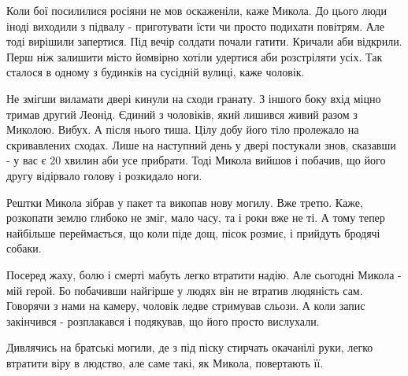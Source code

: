 
Коли бої посилилися росіяни не мов оскаженіли, каже Микола. До цього люди іноді
виходили з підвалу - приготувати їсти чи просто подихати повітрям. Але тоді
вирішили запертися. Під вечір солдати почали гатити. Кричали аби відкрили. Перш
ніж залишити місто йомвірно хотіли удертися аби розстріляти усіх. Так сталося в
одному з будинків на сусідній вулиці, каже чоловік.

Не змігши виламати двері кинули на сходи гранату. З іншого боку вхід міцно
тримав другий Леонід. Єдиний з чоловіків, який лишився живий разом з Миколою.
Вибух. А після нього тиша. Цілу добу його тіло пролежало на скривавлених
сходах. Лише на наступний день у двері постукали знов, сказавши - у вас є 20
хвилин аби усе прибрати. Тоді Микола вийшов і побачив, що його другу відірвало
голову і розкидало ноги.

Рештки Микола зібрав у пакет та викопав нову могилу. Вже третю. Каже, розкопати
землю глибоко не зміг, мало часу, та і роки вже не ті. А тому тепер найбільше
переймається, що коли піде дощ, пісок розмиє, і прийдуть бродячі собаки.


Посеред жаху, болю і смерті мабуть легко втратити надію. Але сьогодні Микола -
мій герой. Бо побачивши найгірше у людях він не втратив людяність сам. Говорячи
з нами на камеру, чоловік ледве стримував сльози. А коли запис закінчився -
розплакався і подякував, що його просто вислухали. 

Дивлячись на братські могили, де з під піску стирчать окачанілі руки, легко
втратити віру в людство, але саме такі, як Микола, повертають її.

